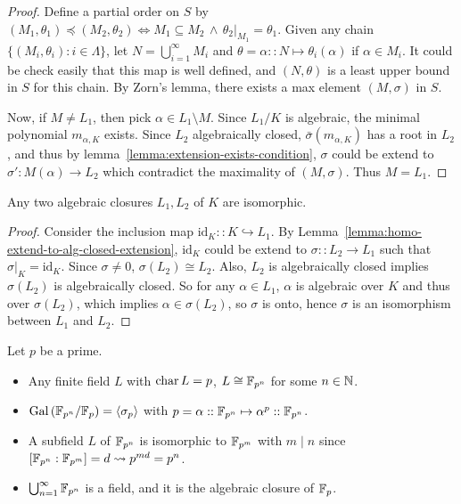 \begin{theorem}
\begin{lemma}
\begin{proof}
      Define a partial order on $S$ by $(M_1, \theta_1) \preceq (M_2, \theta_2)
      \iff M_1 \subseteq M_2 \,\land\, \theta_2 \big|_{M_1} = \theta_1$.
      Given any chain $\{(M_i, \theta_i) : i \in \Lambda \}$, let $N = \bigcup_{i = 1}^\infty M_i$ and
      $\theta = \alpha :: N \mapsto \theta_i(\alpha)$ if $\alpha \in M_i$. It could
      be check easily that this map is well defined, and $(N, \theta)$ is
      a least upper bound in $S$ for this chain.  By Zorn's lemma, there exists a max element $(M, \sigma)$ in $S$.

      Now, if $M \neq L_1$, then pick $\alpha \in L_1 \setminus M$. Since $L_1/K$ is algebraic,
      the minimal polynomial $m_{\alpha, K}$ exists. Since $L_2$ algebraically closed, $\bar\sigma(m_{\alpha, K})$
      has a root in $L_2$, and thus by lemma~\ref{lemma:extension-exists-condition},
      $\sigma$ could be extend to $\sigma': M(\alpha) \to L_2$ which contradict the maximality of $(M, \sigma)$.
      Thus $M = L_1$.
    \end{proof}
  \end{lemma}

  \begin{theorem}
    Any two algebraic closures $L_1, L_2$ of $K$ are isomorphic.
    \begin{proof}
      Consider the inclusion map $\text{id}_K :: K \hookrightarrow L_1$.
      By Lemma~\ref{lemma:homo-extend-to-alg-closed-extension},
      $\text{id}_K$ could be extend to $\sigma :: L_2 \to L_1$ such that $\sigma\big|_K = \text{id}_K$.
      Since $\sigma \neq 0$, $\sigma(L_2) \cong L_2$.
      Also, $L_2$ is algebraically closed implies $\sigma(L_2)$ is algebraically closed.
      So for any $\alpha \in L_1$, $\alpha$ is algebraic over $K$ and thus over $\sigma(L_2)$,
      which implies $\alpha \in \sigma(L_2)$, so $\sigma$ is onto, hence $\sigma$ is an
      isomorphism between $L_1$ and $L_2$.
    \end{proof}
  \end{theorem}

  \begin{example}
    Let $p$ be a prime.
    \begin{itemize}
      \item Any finite field $L$ with $\operatorname{char} L = p$, $L \cong \mathbb{F}_{p^n}$ for
        some $n \in \mathbb{N}$.
      \item $\operatorname{Gal}\left(\mathbb{F}_{p^n} / \mathbb{F}_p\right) = \langle\sigma_p\rangle$ with
        $p = \alpha :: \mathbb{F}_{p^n} \mapsto \alpha^p :: \mathbb{F}_{p^n}$.
      \item A subfield $L$ of $\mathbb{F}_{p^n}$ is isomorphic to $\mathbb{F}_{p^m}$ with
        $m \mid n$ since $[\mathbb{F}_{p^n} : \mathbb{F}_{p^m}] = d \leadsto p^{md} = p^n$.
      \item $\bigcup_{n=1}^\infty \mathbb{F}_{p^n}$ is a field, and it is the
        algebraic closure of $\mathbb{F}_p$.
    \end{itemize}
  \end{example}
\end{theorem}

